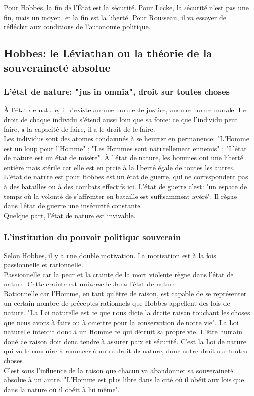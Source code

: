 \documentclass[10pt, a4paper, openany]{book}
\begin{document}
Pour Hobbes, la fin de l'État est la sécurité. Pour Locke, la sécurité n'est pas une fin, mais un moyen, et la fin est la liberté. Pour Rousseau, il va essayer de réfléchir aux conditions de l'autonomie politique. 


\subsection{Hobbes: le Léviathan ou la théorie de la souveraineté absolue}

\subsubsection{L'état de nature: "jus in omnia", droit sur toutes choses}

À l'état de nature, il n'existe aucune norme de justice, aucune norme morale. Le droit de chaque individu s'étend aussi loin que sa force: ce que l'individu peut faire, a la capacité de faire, il a le droit de le faire. \\
Les individus sont des atomes condamnés à se heurter en permanence: "L'Homme est un loup pour l'Homme" ; "Les Hommes sont naturellement ennemis" ; "L'état de nature est un état de misère". À l'état de nature, les hommes ont une liberté entière mais stérile car elle est en proie à la liberté égale de toutes les autres. L'état de nature est pour Hobbes est un état de guerre, qui ne correspondent pas à des batailles ou à des combats effectifs ici. L'état de guerre c'est: "un espace de temps où la volonté de s'affronter en bataille est suffisamment avéré". Il règne dans l'état de guerre une insécurité constante. \\
Quelque part, l'état de nature est invivable. 

\subsubsection{L'institution du pouvoir politique souverain}

Selon Hobbes, il y a une double motivation. La motivation est à la fois passionnelle et rationnelle. \\
Passionnelle car la peur et la crainte de la mort violente règne dans l'état de nature. Cette crainte est universelle dans l'état de nature. \\
Rationnelle car l'Homme, en tant qu'être de raison, est capable de se représenter un certain nombre de préceptes rationnels que Hobbes appellent des lois de nature. "La Loi naturelle est ce que nous dicte la droite raison touchant les choses que nous avons à faire ou à omettre pour la conservation de notre vie". La Loi naturelle interdit donc à un Homme ce qui détruit sa propre vie. L'être humain doué de raison doit donc tendre à assurer paix et sécurité. C'est la Loi de nature qui va le conduire à renoncer à notre droit de nature, donc notre droit sur toutes choses. \\
C'est sous l'influence de la raison que chacun va abandonner sa souveraineté absolue à un autre. "L'Homme est plus libre dans la cité où il obéit aux lois que dans la nature où il obéit à lui même". 
\end{document}
